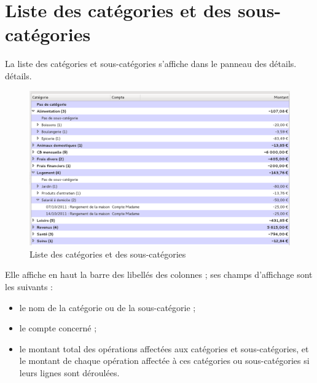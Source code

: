 

\section{Liste des catégories et des sous-catégories\label{categories-list}}


La liste des catégories et sous-catégories s'affiche dans le panneau des \ifIllustration détails.
\else détails.
\fi

\ifIllustration
\begin{figure}[htbp]
\begin{center}
\includegraphics[scale=0.5]{image/screenshot/categories_list.png}
\end{center}
\caption{Liste des catégories et des sous-catégories}
\label{categories-list-img}
\end{figure}
\fi

Elle affiche en haut la barre des libellés des colonnes ; ses champs d'affichage sont les suivants :
\begin{itemize}
	 \item le nom de la catégorie ou de la sous-catégorie ;
	 \item le compte concerné ;
	 \item le montant total des opérations affectées aux  catégories et sous-catégories, et le montant de chaque opération affectée à ces catégories ou sous-catégories si leurs lignes sont déroulées.
\end{itemize}

